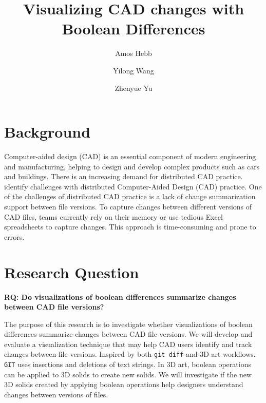 \documentclass[sigconf,authorversion,nonacm]{acmart}
\begin{document}
\title{Visualizing CAD changes with Boolean Differences}

\author{Amos Hebb}
\author{Yilong Wang}
\author{Zhenyue Yu}
\makeatletter
\def\@ACM@checkaffil{%
	\if@ACM@instpresent\else
		\ClassWarningNoLine{\@classname}{No institution present for an affiliation}%
	\fi
	\if@ACM@citypresent\else
		\ClassWarningNoLine{\@classname}{No city present for an affiliation}%
	\fi
	\if@ACM@countrypresent\else
		\ClassWarningNoLine{\@classname}{No country present for an affiliation}%
	\fi
}
\makeatother

\maketitle

\section{Background}

Computer-aided design (CAD) is an essential component of modern engineering and manufacturing, helping to design and develop complex products such as cars and buildings. There is an increasing demand for distributed CAD practice. \citet{cheng2023age} identify challenges with distributed Computer-Aided Design (CAD) practice. One of the challenges of distributed CAD practice is a lack of change summarization support between file versions. To capture changes between different versions of CAD files, teams currently rely on their memory or use tedious Excel spreadsheets to capture changes. This approach is time-consuming and prone to errors.
\section{Research Question}

\textbf{RQ: Do visualizations of boolean differences summarize changes between CAD file versions?}

The purpose of this research is to investigate whether visualizations of boolean differences summarize changes between CAD file versions. We will develop and evaluate a visualization technique that may help CAD users identify and track changes between file versions. Inspired by both \texttt{git diff} and 3D art workflows. \texttt{GIT} uses insertions and deletions of text strings. In 3D art, boolean operations can be applied to 3D solids to create new solids. We will investigate if the new 3D solids created by applying boolean operations help designers understand changes between versions of files.
\end{document}
